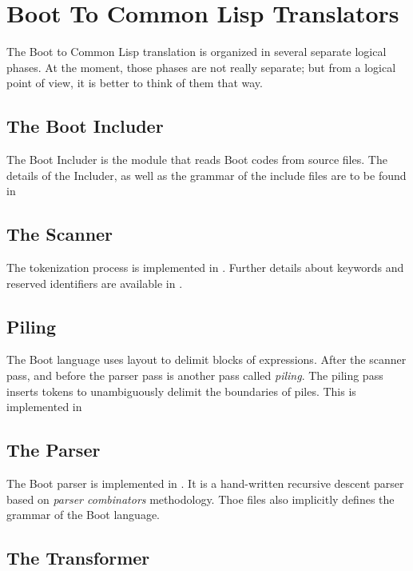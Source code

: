 \documentclass{article}
\begin{document}
\section{Boot To Common Lisp Translators}
\label{sec:boot-to-cl}

The Boot to Common Lisp translation is organized in several
separate logical phases.  At the moment, those phases are not
really separate; but from a logical point of view, it is better
to think of them that way.


\subsection{The Boot Includer}
\label{sec:boot-to-cl:includer}

The Boot Includer is the module that reads Boot codes from source files.
The details of the Includer, as well as the grammar of the include
files are to be found in 


\subsection{The Scanner}
\label{sec:boot-to-cl:scanner}

The tokenization process is implemented in .  Further
details about keywords and reserved identifiers are available in
.


\subsection{Piling}
\label{sec:boot-to-cl:piling}

The Boot language uses layout to delimit blocks of expressions. After
the scanner pass, and before the parser pass is another pass called
\emph{piling}.  The piling pass inserts tokens to unambiguously delimit
the boundaries of piles.  This is implemented in


\subsection{The Parser}
\label{sec:boot-to-cl:piling}

The Boot parser is implemented in .  It is a hand-written
recursive descent parser
based on \emph{parser combinators} methodology.  Thoe files also
implicitly defines the grammar of the Boot language.


\subsection{The Transformer}
\label{sec:boot-to-cl:transfo}
\end{document}
